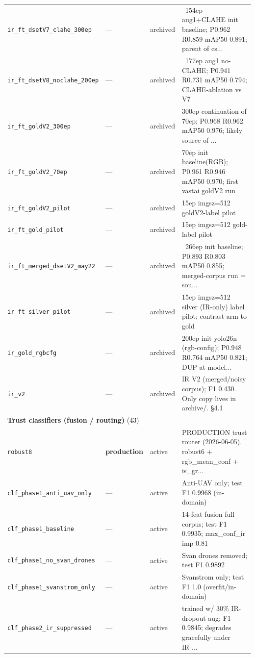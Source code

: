 \begin{longtable}{p{}llp{}}
\texttt{ir\_ft\_dsetV7\_clahe\_300ep} & --- & archived & ~154ep aug1+CLAHE init baseline; P0.962 R0.859 mAP50 0.891; parent of cs... \\
\texttt{ir\_ft\_dsetV8\_noclahe\_200ep} & --- & archived & ~177ep aug1 no-CLAHE; P0.941 R0.731 mAP50 0.794; CLAHE-ablation vs V7 \\
\texttt{ir\_ft\_goldV2\_300ep} & --- & archived & 300ep continuation of 70ep; P0.968 R0.962 mAP50 0.976; likely source of ... \\
\texttt{ir\_ft\_goldV2\_70ep} & --- & archived & 70ep init baseline(RGB); P0.961 R0.946 mAP50 0.970; first vastai goldV2 run \\
\texttt{ir\_ft\_goldV2\_pilot} & --- & archived & 15ep imgsz=512 goldV2-label pilot \\
\texttt{ir\_ft\_gold\_pilot} & --- & archived & 15ep imgsz=512 gold-label pilot \\
\texttt{ir\_ft\_merged\_dsetV2\_may22} & --- & archived & ~266ep init baseline; P0.893 R0.803 mAP50 0.855; merged-corpus run = sou... \\
\texttt{ir\_ft\_silver\_pilot} & --- & archived & 15ep imgsz=512 silver (IR-only) label pilot; contrast arm to gold \\
\texttt{ir\_gold\_rgbcfg} & --- & archived & 200ep init yolo26n (rgb-config); P0.948 R0.764 mAP50 0.821; DUP at model... \\
\texttt{ir\_v2} & --- & archived & IR V2 (merged/noisy corpus); F1 0.430. Only copy lives in archive/. §4.1 \\
\midrule
\multicolumn{4}{l}{\textbf{Trust classifiers (fusion / routing)} (43)} \\
\midrule
\texttt{robust8} & \textbf{production} & active & PRODUCTION trust router (2026-06-05). robust6 + rgb\_mean\_conf + is\_gr... \\
\texttt{clf\_phase1\_anti\_uav\_only} & --- & active & Anti-UAV only; test F1 0.9968 (in-domain) \\
\texttt{clf\_phase1\_baseline} & --- & active & 14-feat fusion full corpus; test F1 0.9935; max\_conf\_ir imp 0.81 \\
\texttt{clf\_phase1\_no\_svan\_drones} & --- & active & Svan drones removed; test F1 0.9892 \\
\texttt{clf\_phase1\_svanstrom\_only} & --- & active & Svanstrom only; test F1 1.0 (overfit/in-domain) \\
\texttt{clf\_phase2\_ir\_suppressed} & --- & active & trained w/ 30\% IR-dropout aug; F1 0.9845; degrades gracefully under IR-... \\

\end{longtable}
